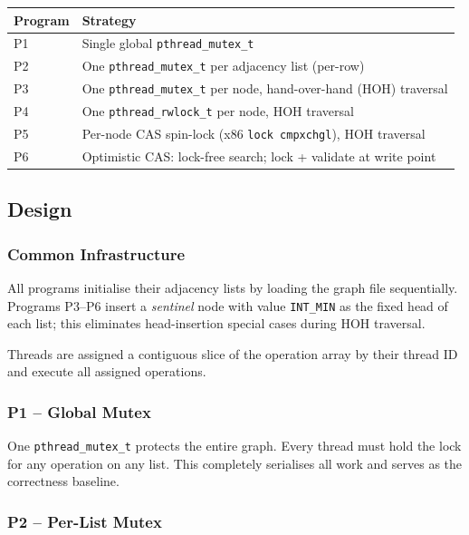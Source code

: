 \documentclass{article}
\begin{document}
\begin{center}
\begin{tabular}{ll}
\toprule
\textbf{Program} & \textbf{Strategy} \\
\midrule
P1 & Single global \texttt{pthread\_mutex\_t} \\
P2 & One \texttt{pthread\_mutex\_t} per adjacency list (per-row) \\
P3 & One \texttt{pthread\_mutex\_t} per node, hand-over-hand (HOH) traversal \\
P4 & One \texttt{pthread\_rwlock\_t} per node, HOH traversal \\
P5 & Per-node CAS spin-lock (x86 \texttt{lock cmpxchgl}), HOH traversal \\
P6 & Optimistic CAS: lock-free search; lock + validate at write point \\
\bottomrule
\end{tabular}
\end{center}

\subsection{Design}

\subsubsection{Common Infrastructure}

All programs initialise their adjacency lists by loading the graph file
sequentially. Programs P3--P6 insert a \emph{sentinel} node with value
\texttt{INT\_MIN} as the fixed head of each list; this eliminates
head-insertion special cases during HOH traversal.

Threads are assigned a contiguous slice of the operation array by their
thread ID and execute all assigned operations.

\subsubsection{P1 -- Global Mutex}

One \texttt{pthread\_mutex\_t} protects the entire graph. Every thread
must hold the lock for any operation on any list. This completely
serialises all work and serves as the correctness baseline.

\subsubsection{P2 -- Per-List Mutex}
\end{document}
